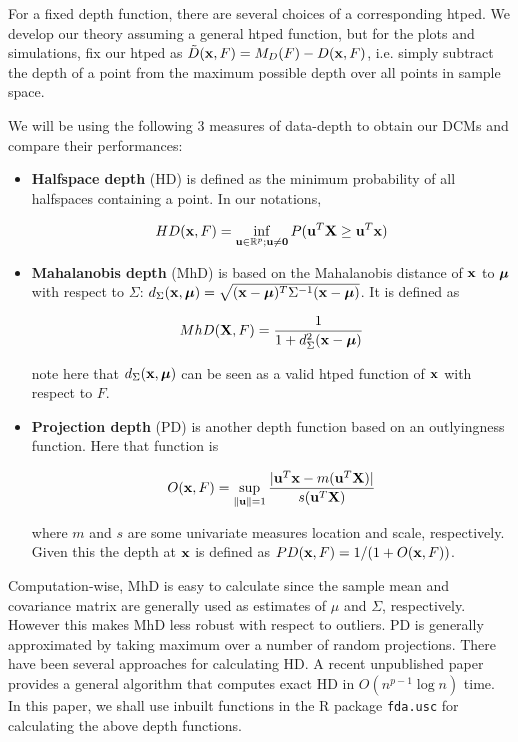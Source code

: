 \documentclass[10pt]{book}
\begin{document}
For a fixed depth function, there are several choices of a corresponding htped. We develop our theory assuming a general htped function, but for the plots and simulations, fix our htped as $\tilde D({\bf{x}}, F) = M_D(F) - D({\bf{x}}, F)$, i.e. simply subtract the depth of a point from the maximum possible depth over all points in sample space.

We will be using the following 3 measures of data-depth to obtain our DCMs and compare their performances:

\begin{itemize}
\item \textbf{Halfspace depth} (HD) \citep{tukey75} is defined as the minimum probability of all halfspaces containing a point. In our notations,

$$ HD({\bf{x}}, F)  = \inf_{{\bf{u}} \in \mathbb{R}^p; {\bf{u}} \neq \bf0} P({\bf{u}}^T {\mathbf{X}} \geq {\bf{u}}^T {\bf{x}}) $$

\item \textbf{Mahalanobis depth} (MhD) \citep{LiuPareliusSingh99} is based on the Mahalanobis distance of ${\bf{x}}$ to ${\boldsymbol{\mu}}$ with respect to $\Sigma$: $d_\Sigma({\bf{x}}, {\boldsymbol{\mu}}) = \sqrt{({\bf{x}} - {\boldsymbol{\mu}})^T \Sigma^{-1} ({\bf{x}} - {\boldsymbol{\mu}})}$. It is defined as

$$ MhD({\mathbf{X}}, F) = \frac{1}{1 + d^2_\Sigma ({\bf{x}} - {\boldsymbol{\mu}})} $$

note here that $d_\Sigma({\bf{x}},{\boldsymbol{\mu}})$ can be seen as a valid htped function of ${\bf{x}}$ with respect to $F$.

\item \textbf{Projection depth} (PD) \citep{zuo03} is another depth function based on an outlyingness function. Here that function is

$$ O({\bf{x}}, F) = \sup_{\| {\bf{u}} \| = 1} \frac{| {\bf{u}}^T{\bf{x}} - m({\bf{u}}^T{\mathbf{X}})|}{s({\bf{u}}^T{\mathbf{X}})} $$

where $m$ and $s$ are some univariate measures location and scale, respectively. Given this the depth at ${\bf{x}}$ is defined as $PD({\bf{x}}, F) = 1/(1+O({\bf{x}}, F))$.
\end{itemize}

Computation-wise, MhD is easy to calculate since the sample mean and covariance matrix are generally used as estimates of $\mu$ and $\Sigma$, respectively. However this makes MhD less robust with respect to outliers. PD is generally approximated by taking maximum over a number of random projections. There have been several approaches for calculating HD. A recent unpublished paper \citep{rainerArxiv} provides a general algorithm that computes exact HD in $O(n^{p-1}\log n)$ time. In this paper, we shall use inbuilt functions in the R package \texttt{fda.usc} for calculating the above depth functions.
\end{document}
